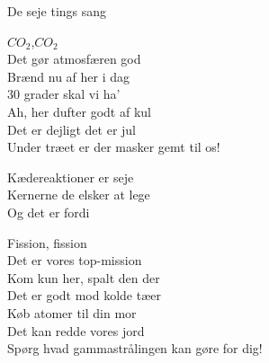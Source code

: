 \begin{song}{De seje tings sang}
  \begin{SBChorus}
    $CO_2$,$CO_2$\\
    Det gør atmosfæren god\\
    Brænd nu af her i dag\\
    30 grader skal vi ha'\\
    Ah, her dufter godt af kul\\
    Det er dejligt det er jul\\
    Under træet er der masker gemt til os!
  \end{SBChorus}

  \begin{SBVerse}
    Kædereaktioner er seje\\
    Kernerne de elsker at lege\\
    Og det er fordi
  \end{SBVerse}

  \begin{SBChorus}
    Fission, fission\\
    Det er vores top-mission\\
    Kom kun her, spalt den der\\
    Det er godt mod kolde tæer\\
    Køb atomer til din mor\\
    Det kan redde vores jord\\
    Spørg hvad gammastrålingen kan gøre for dig!
  \end{SBChorus}
\end{song}